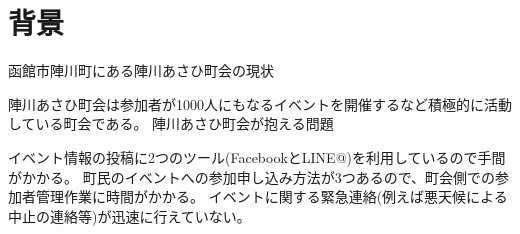 \section{背景}
函館市陣川町にある陣川あさひ町会の現状

 陣川あさひ町会は参加者が1000人にもなるイベントを開催するなど積極的に活動している町会である。
陣川あさひ町会が抱える問題

 イベント情報の投稿に2つのツール(FacebookとLINE@)を利用しているので手間がかかる。
 町民のイベントへの参加申し込み方法が3つあるので、町会側での参加者管理作業に時間がかかる。
 イベントに関する緊急連絡(例えば悪天候による中止の連絡等)が迅速に行えていない。
